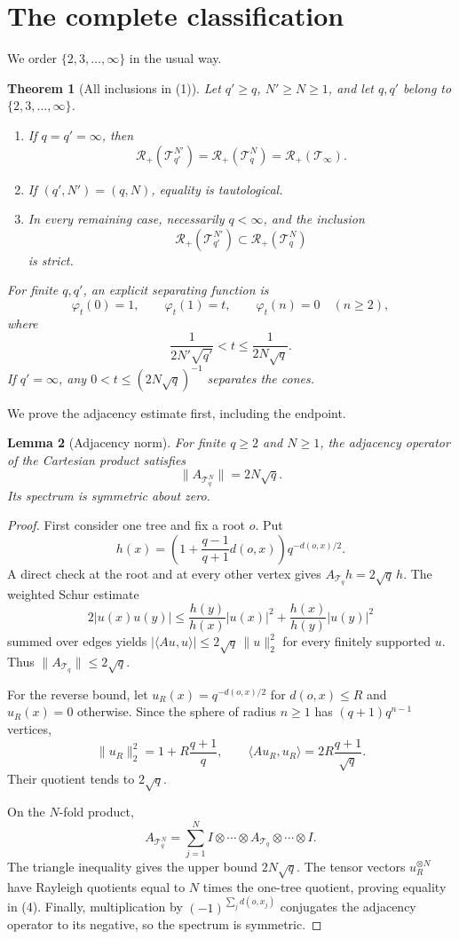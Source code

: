 \documentclass[11pt]{article}
\newtheorem{theorem}{Theorem}
\newtheorem{lemma}[theorem]{Lemma}
\newcommand{\Rcone}{\mathcal R_+}
\newcommand{\Ttree}{\mathcal T}
\begin{document}
\section{The complete classification}

We order $\{2,3,\ldots,\infty\}$ in the usual way.

\begin{theorem}[All inclusions in (1)]\label{thm:classification}
Let $q'\ge q$, $N'\ge N\ge1$, and let $q,q'$ belong to
$\{2,3,\ldots,\infty\}$.
\begin{enumerate}
\item If $q=q'=\infty$, then
\[
 \Rcone(\Ttree_{q'}^{N'})=\Rcone(\Ttree_q^N)
 =\Rcone(\Ttree_\infty).
\]
\item If $(q',N')=(q,N)$, equality is tautological.
\item In every remaining case, necessarily $q<\infty$, and the inclusion
\[
 \Rcone(\Ttree_{q'}^{N'})\subset \Rcone(\Ttree_q^N)
\]
is strict.
\end{enumerate}
For finite $q,q'$, an explicit separating function is
\[
 \varphi_t(0)=1,\qquad \varphi_t(1)=t,\qquad
 \varphi_t(n)=0\quad(n\ge2), \tag{2}
\]
where
\[
 \frac1{2N'\sqrt{q'}}<t\le \frac1{2N\sqrt q}. \tag{3}
\]
If $q'=\infty$, any $0<t\le(2N\sqrt q)^{-1}$ separates the cones.
\end{theorem}

We prove the adjacency estimate first, including the endpoint.

\begin{lemma}[Adjacency norm]\label{lem:norm}
For finite $q\ge2$ and $N\ge1$, the adjacency operator of the Cartesian
product satisfies
\[
 \bigl\|A_{\Ttree_q^N}\bigr\|=2N\sqrt q. \tag{4}
\]
Its spectrum is symmetric about zero.
\end{lemma}

\begin{proof}
First consider one tree and fix a root $o$.  Put
\[
 h(x)=\left(1+\frac{q-1}{q+1}d(o,x)\right)q^{-d(o,x)/2}.
\]
A direct check at the root and at every other vertex gives
$A_{\Ttree_q}h=2\sqrt q\,h$.  The weighted Schur estimate
\[
 2|u(x)u(y)|
 \le \frac{h(y)}{h(x)}|u(x)|^2
      +\frac{h(x)}{h(y)}|u(y)|^2
\]
summed over edges yields
$|\langle Au,u\rangle|\le2\sqrt q\,\|u\|_2^2$ for every finitely supported
$u$.  Thus $\|A_{\Ttree_q}\|\le2\sqrt q$.

For the reverse bound, let $u_R(x)=q^{-d(o,x)/2}$ for $d(o,x)\le R$ and
$u_R(x)=0$ otherwise.  Since the sphere of radius $n\ge1$ has
$(q+1)q^{n-1}$ vertices,
\[
 \|u_R\|_2^2=1+R\frac{q+1}{q},\qquad
 \langle Au_R,u_R\rangle=2R\frac{q+1}{\sqrt q}.
\]
Their quotient tends to $2\sqrt q$.

On the $N$-fold product,
\[
 A_{\Ttree_q^N}=\sum_{j=1}^N
 I\otimes\cdots\otimes A_{\Ttree_q}\otimes\cdots\otimes I.
\]
The triangle inequality gives the upper bound $2N\sqrt q$.  The tensor vectors
$u_R^{\otimes N}$ have Rayleigh quotients equal to $N$ times the one-tree
quotient, proving equality in (4).  Finally, multiplication by
$(-1)^{\sum_j d(o,x_j)}$ conjugates the adjacency operator to its negative,
so the spectrum is symmetric.
\end{proof}
\end{document}
